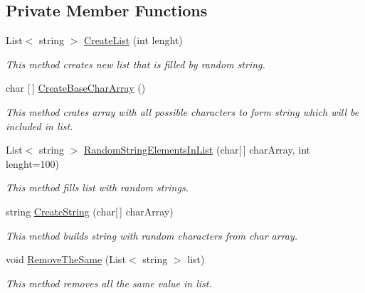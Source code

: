 \subsection*{Private Member Functions}
\begin{DoxyCompactItemize}
\item 
List$<$ string $>$ \mbox{\hyperlink{class_home_work_1_1_task_library_1_1_tasks_1_1_lesson5_1_1_task3_af69ce2fd88d83f9b4f7caa588b5e2d5f}{Create\+List}} (int lenght)
\begin{DoxyCompactList}\small\item\em This method creates new list that is filled by random string. \end{DoxyCompactList}\item 
char \mbox{[}$\,$\mbox{]} \mbox{\hyperlink{class_home_work_1_1_task_library_1_1_tasks_1_1_lesson5_1_1_task3_a6a9221a32dccd837a0f9f38ad8a5fb50}{Create\+Base\+Char\+Array}} ()
\begin{DoxyCompactList}\small\item\em This method crates array with all possible characters to form string which will be included in list. \end{DoxyCompactList}\item 
List$<$ string $>$ \mbox{\hyperlink{class_home_work_1_1_task_library_1_1_tasks_1_1_lesson5_1_1_task3_ac575bb5863c7aeab47a535a99653d6c9}{Random\+String\+Elements\+In\+List}} (char\mbox{[}$\,$\mbox{]} char\+Array, int lenght=100)
\begin{DoxyCompactList}\small\item\em This method fills list with random strings. \end{DoxyCompactList}\item 
string \mbox{\hyperlink{class_home_work_1_1_task_library_1_1_tasks_1_1_lesson5_1_1_task3_a8df5e139d6adf386ca0bccc5eb87eb48}{Create\+String}} (char\mbox{[}$\,$\mbox{]} char\+Array)
\begin{DoxyCompactList}\small\item\em This method builds string with random characters from char array. \end{DoxyCompactList}\item 
void \mbox{\hyperlink{class_home_work_1_1_task_library_1_1_tasks_1_1_lesson5_1_1_task3_a0f1e451c07d2d49f3449118bdbe1473a}{Remove\+The\+Same}} (List$<$ string $>$ list)
\begin{DoxyCompactList}\small\item\em This method removes all the same value in list. \end{DoxyCompactList}\item 

\end{DoxyCompactItemize}
